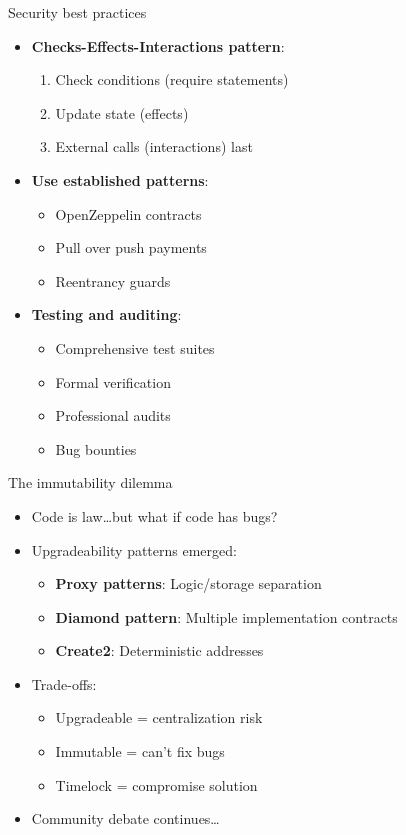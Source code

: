 \documentclass[aspectratio=169, lualatex, handout]{beamer}
\begin{document}
\begin{frame}{Security best practices}
	\begin{itemize}
		\item \textbf{Checks-Effects-Interactions pattern}:
		      \begin{enumerate}
			      \item Check conditions (require statements)
			      \item Update state (effects)
			      \item External calls (interactions) last
		      \end{enumerate}
		\item \textbf{Use established patterns}:
		      \begin{itemize}
			      \item OpenZeppelin contracts
			      \item Pull over push payments
			      \item Reentrancy guards
		      \end{itemize}
		\item \textbf{Testing and auditing}:
		      \begin{itemize}
			      \item Comprehensive test suites
			      \item Formal verification
			      \item Professional audits
			      \item Bug bounties
		      \end{itemize}
	\end{itemize}
\end{frame}

\begin{frame}{The immutability dilemma}
	\begin{itemize}
		\item Code is law\ldots but what if code has bugs?
		\item Upgradeability patterns emerged:
		      \begin{itemize}
			      \item \textbf{Proxy patterns}: Logic/storage separation
			      \item \textbf{Diamond pattern}: Multiple implementation contracts
			      \item \textbf{Create2}: Deterministic addresses
		      \end{itemize}
		\item Trade-offs:
		      \begin{itemize}
			      \item Upgradeable = centralization risk
			      \item Immutable = can't fix bugs
			      \item Timelock = compromise solution
		      \end{itemize}
		\item Community debate continues\ldots
	\end{itemize}
\end{frame}
\end{document}
